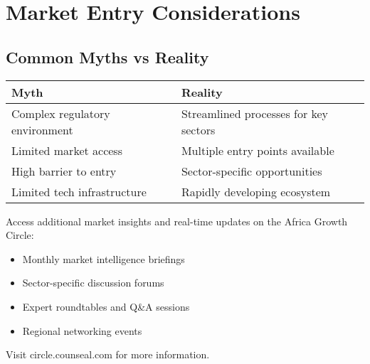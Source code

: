 \section{Market Entry Considerations}

\subsection{Common Myths vs Reality}
\begin{center}
\begin{tabular}{p{}|p{}}
    \textbf{Myth} & \textbf{Reality} \\
    \hline
    Complex regulatory environment & Streamlined processes for key sectors \\
    Limited market access & Multiple entry points available \\
    High barrier to entry & Sector-specific opportunities \\
    Limited tech infrastructure & Rapidly developing ecosystem \\
\end{tabular}
\end{center}

\begin{communitybox}
Access additional market insights and real-time updates on the Africa Growth Circle:
\begin{itemize}
    \item Monthly market intelligence briefings
    \item Sector-specific discussion forums
    \item Expert roundtables and Q\&A sessions
    \item Regional networking events
\end{itemize}
Visit circle.counseal.com for more information.
\end{communitybox}

